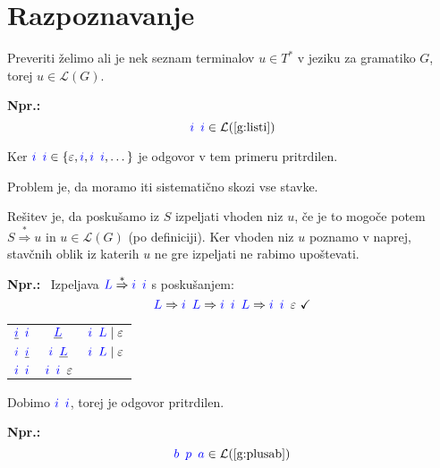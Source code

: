 \documentclass{article}
\newcommand{\Ex}{\textbf{Npr.:}\ }
\newcommand{\OK}{\ \checkmark}
\newcommand{\Symbol}[1]{\textcolor{blue}{#1}}
\newcommand{\Grammar}{G}
\newcommand{\StartSymbol}{S}
\newcommand{\Null}{\varepsilon}
\newcommand{\Language}[1]{\mathcal{L}(#1)}
\newcommand{\MathRef}[1]{\text{\ref{#1}}}
\newcommand{\Derive}{\Rightarrow}
\newcommand{\DeriveStar}{\overset{\ast}{\Rightarrow}}
\newcommand{\Seq}{{\ \,}}
\newcommand{\Union}{\mathrel{|}}
\newcommand{\Kleene}[1]{#1^\ast}
\begin{document}
\section{Razpoznavanje}

Preveriti želimo ali je nek seznam terminalov $u \in \Kleene{T}$ v jeziku za gramatiko $\Grammar$, torej $u \in \Language{\Grammar}$.

\Ex
  \begin{equation*}
    \Symbol{i} \Seq \Symbol{i} \in \Language{\MathRef{g:listi}}
  \end{equation*}

  Ker $\Symbol{i} \Seq \Symbol{i} \in \{\Null, \Symbol{i}, \Symbol{i} \Seq \Symbol{i}, \dots\}$ je odgovor v tem primeru pritrdilen.

Problem je, da moramo iti sistematično skozi vse stavke.

Rešitev je, da poskušamo iz $\StartSymbol$ izpeljati vhoden niz $u$, če je to mogoče potem $\StartSymbol \DeriveStar u$ in $u \in \Language{\Grammar}$ (po definiciji).
Ker vhoden niz $u$ poznamo v naprej, stavčnih oblik iz katerih $u$ ne gre izpeljati ne rabimo upoštevati.

\Ex
Izpeljava $\Symbol{L} \DeriveStar \Symbol{i} \Seq \Symbol{i}$ s poskušanjem:
  \begin{equation*}
    \Symbol{L} \Derive \Symbol{i} \Seq \Symbol{L} \Derive \Symbol{i} \Seq \Symbol{i} \Seq \Symbol{L} \Derive \Symbol{i} \Seq \Symbol{i} \Seq \Null \OK
  \end{equation*}
  \begin{center}
  \begin{tabular}{|c|c|c|}
    \hline
    $\underline{\Symbol{i}} \Seq \Symbol{i}$ & $\underline{\Symbol{L}}$ & $\Symbol{i} \Seq \Symbol{L} \Union \Null$ \\ 
    $\Symbol{i} \Seq \underline{\Symbol{i}}$ & $\Symbol{i} \Seq \underline{\Symbol{L}}$ & $\Symbol{i} \Seq \Symbol{L} \Union \Null$ \\ 
    \hline
    $\Symbol{i} \Seq \Symbol{i}$ & $\Symbol{i} \Seq \Symbol{i} \Seq \Null$  &  \\ 
    \hline
  \end{tabular}
  \end{center}
  Dobimo $\Symbol{i} \Seq \Symbol{i}$, torej je odgovor pritrdilen.

\Ex
  \begin{equation*}
    \Symbol{b} \Seq \Symbol{p} \Seq \Symbol{a} \in \Language{\MathRef{g:plusab}}
  \end{equation*}
\end{document}

